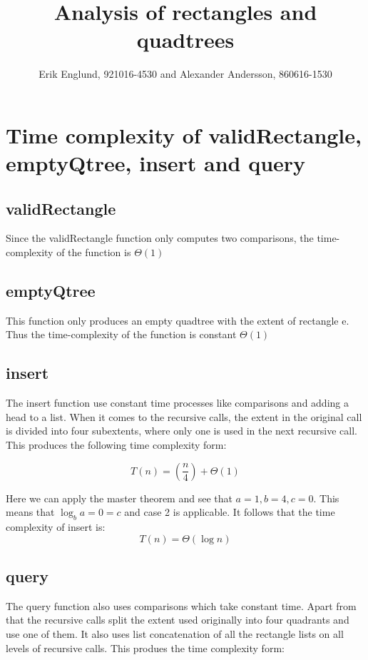 \documentclass[12pt, a4paper]{article}
\title{Analysis of rectangles and quadtrees}
\author{Erik Englund, 921016-4530 and Alexander Andersson, 860616-1530}
\begin{document}
\maketitle

\section{Time complexity of validRectangle, emptyQtree, insert and query}

\subsection{validRectangle}

Since the validRectangle function only computes two comparisons, the time-complexity of the function is 
$\Theta(1)$




\subsection{emptyQtree}

This function only produces an empty quadtree with the extent of rectangle e. Thus the time-complexity of the function is constant $\Theta(1)$



\subsection{insert}

The insert function use constant time processes like comparisons and adding a head to a list. When it comes to the recursive calls, the extent in the original call is divided into four subextents, where only one is used in the next recursive call. This produces the following time complexity form:

$$T(n)=\left(\frac{n}{4}\right)+\Theta(1)$$

Here we can apply the master theorem and see that $a=1, b=4, c=0$. This means that $\log_ba=0 = c$ and case 2 is applicable. It follows that the time complexity of insert is: $$T(n)=\Theta(\log n)$$





\subsection{query}

The query function also uses comparisons which take constant time. Apart from that the recursive calls split the extent used originally into four quadrants and use one of them. It also uses list concatenation of all the rectangle lists on all levels of recursive calls. This produes the time complexity form:
\end{document}
